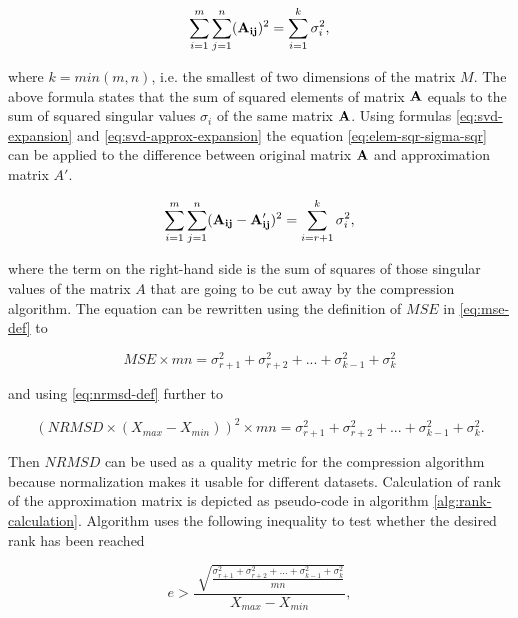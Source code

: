 \begin{equation}
\sum_{i=1}^{m} \sum_{j=1}^{n} (\mathbf{A_{ij}})^{2} = \sum_{i=1}^{k}{\sigma_{i}^{2}},
\label{eq:elem-sqr-sigma-sqr}
\end{equation}

where $k=min(m, n)$, i.e. the smallest of two dimensions of the matrix $M$. The above formula states that the sum of squared elements of matrix $\mathbf{A}$ equals to the sum of squared singular values $\sigma_{i}$ of the same matrix $\mathbf{A}$.  Using formulas \eqref{eq:svd-expansion} and \eqref{eq:svd-approx-expansion} the equation \eqref{eq:elem-sqr-sigma-sqr} can be applied to the difference between original matrix $\mathbf{A}$ and approximation matrix $A'$.

\begin{equation}
\sum_{i=1}^{m} \sum_{j=1}^{n} (\mathbf{A_{ij}} - \mathbf{A'_{ij}})^{2} = \sum_{i=r+1}^{k}{\sigma_{i}^{2}},
\end{equation}

where the term on the right-hand side is the sum of squares of those singular values of the matrix $A$ that are going to be cut away by the compression algorithm. The equation can be rewritten using the definition of $MSE$ in \eqref{eq:mse-def} to

\begin{equation}
MSE \times m n = \sigma_{r+1}^{2} + \sigma_{r+2}^{2} + ... + \sigma_{k-1}^{2} + \sigma_{k}^2
\end{equation}

and using \eqref{eq:nrmsd-def} further to

\begin{equation}
(NRMSD \times (X_{max}-X_{min}))^{2} \times m n = \sigma_{r+1}^{2} + \sigma_{r+2}^{2} + ... + \sigma_{k-1}^{2} + \sigma_{k}^2.
\end{equation}

Then $NRMSD$ can be used as a quality metric for the compression algorithm because normalization makes it usable for different datasets. Calculation of rank of the approximation matrix is depicted as pseudo-code in algorithm \ref{alg:rank-calculation}. Algorithm uses the following inequality to test whether the desired rank has been reached

\begin{equation}
e > \frac{\sqrt[]{\frac{\sigma_{r+1}^{2} + \sigma_{r+2}^{2} + ... + \sigma_{k-1}^{2} + \sigma_{k}^2}{m n}}}{X_{max}-X_{min}},
\end{equation}

